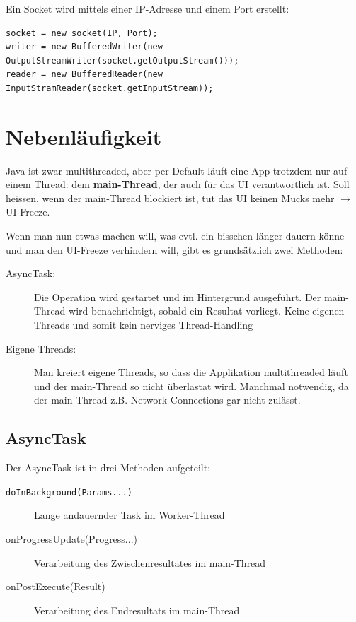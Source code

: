 \documentclass[a4paper, 11pt]{article}
\newcommand{\code}[1]{\texttt{#1}}
\begin{document}
\noindent Ein Socket wird mittels einer IP-Adresse und einem Port erstellt:

\begin{lstlisting}[caption={Erstellung eines Sockets und dessen Reader/Writer}]
socket = new socket(IP, Port);
writer = new BufferedWriter(new OutputStreamWriter(socket.getOutputStream()));
reader = new BufferedReader(new InputStramReader(socket.getInputStream));
\end{lstlisting}

\section{Nebenläufigkeit}
Java ist zwar multithreaded, aber per Default läuft eine App trotzdem nur auf einem Thread: dem \textbf{main-Thread}, der auch für das UI verantwortlich ist. Soll heissen, wenn der main-Thread blockiert ist, tut das UI keinen Mucks mehr $\rightarrow$ UI-Freeze.

Wenn man nun etwas machen will, was evtl. ein bisschen länger dauern könne und man den UI-Freeze verhindern will, gibt es grundsätzlich zwei Methoden:

\begin{description}
	\item[AsyncTask: ] Die Operation wird gestartet und im Hintergrund ausgeführt. Der main-Thread wird benachrichtigt, sobald ein Resultat vorliegt. Keine eigenen Threads und somit kein nerviges Thread-Handling
	\item[Eigene Threads: ] Man kreiert eigene Threads, so dass die Applikation multithreaded läuft und der main-Thread so nicht überlastat wird. Manchmal notwendig, da der main-Thread z.B. Network-Connections gar nicht zulässt.
\end{description}

\subsection{AsyncTask}
Der AsyncTask ist in drei Methoden aufgeteilt:

\begin{description}
	\item[\code{doInBackground(Params...)}] Lange andauernder Task im Worker-Thread
	\item[onProgressUpdate(Progress...)] Verarbeitung des Zwischenresultates im main-Thread
	\item[onPostExecute(Result)] Verarbeitung des Endresultats im main-Thread
\end{description}
\end{document}
